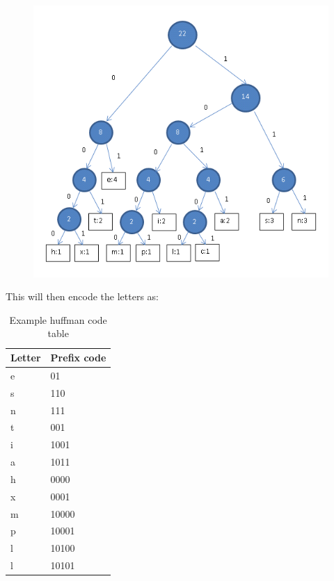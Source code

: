 \begin{figure}[H]
        \centering
        \includegraphics[width=1.00\textwidth]{figures/huffmanTree1.png}
        \label{fig:hufftree1}
\end{figure}

This will then encode the letters as:

\begin{table}[H]
\begin{tabular}{| l | l|}
\hline
\textbf{Letter} & \textbf{Prefix code} \\ \hline \hline
e & 01 \\ \hline
s & 110 \\ \hline
n & 111 \\ \hline
t & 001 \\ \hline
i & 1001 \\ \hline
a & 1011 \\ \hline
h & 0000 \\ \hline
x & 0001 \\ \hline
m & 10000 \\ \hline
p & 10001 \\ \hline
l & 10100 \\ \hline
l & 10101 \\ \hline
\end{tabular}
\caption{Example huffman code table}
\label{tab:huff1}
\end{table}

